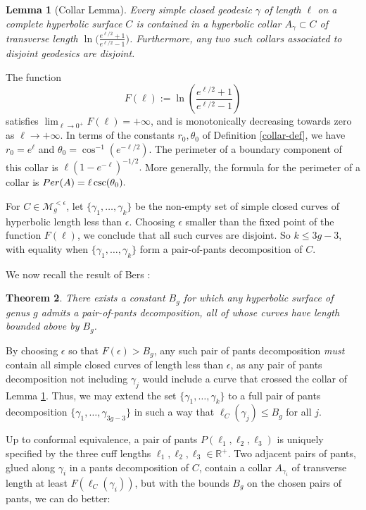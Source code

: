 \documentclass[10pt,letterpaper,english,reqno]{amsart}
\numberwithin{equation}{subsection}
\newcommand\cM{{\mathcal M}}
\newcommand\R{{\mathbb R}}
\newtheorem{theorem}{Theorem}[section]
\newtheorem{lemma}[theorem]{Lemma}
\theoremstyle{definition}
\begin{document}
\begin{lemma}[Collar Lemma]\label{universal-collar}
Every simple closed geodesic $\gamma$
of length $\ell$ on a complete
hyperbolic surface $C$ is contained in a
hyperbolic collar $A_\gamma\subset C$ of transverse
length $\ln \big(\frac{e^{\ell/2}+1}{e^{\ell/2}-1}\big)$.
Furthermore, any two such collars associated
to disjoint geodesics are disjoint. \end{lemma}

The function $$F(\ell):=\ln\left(\frac{e^{\ell/2}+1}{e^{\ell/2}-1}\right)$$ satisfies
$\lim_{\ell\to 0^+} F(\ell)=+\infty$, and is
monotonically decreasing towards zero as $\ell\to +\infty$.
In terms of the constants $r_0,\theta_0$ of 
Definition \ref{collar-def}, we have $r_0 = e^\ell$ and $\theta_0=\cos^{-1}(e^{-\ell/2})$.
The perimeter of
a boundary component of this collar is $\ell(1-e^{-\ell})^{-1/2}.$
More generally, the formula for the perimeter of a collar is ${\rm Per}(A)= \ell\csc(\theta_0).$

For $C\in \cM_g^{<\epsilon}$, let
$\{\gamma_1,\dots,\gamma_k\}$ be the non-empty set of simple closed curves
of hyperbolic length less than $\epsilon$. Choosing $\epsilon$
smaller than the fixed point of the function $F(\ell)$,
we conclude that all such curves are disjoint. 
So $k\leq 3g-3$, with equality when
$\{\gamma_1,\dots,\gamma_k\}$ form a pair-of-pants
decomposition of $C$.

We now recall the result of Bers \cite{bers1, bers2}:

\begin{theorem}\label{pair-of-pants} There exists a constant $B_g$
for which any hyperbolic surface of genus $g$ admits a
pair-of-pants decomposition, all of whose curves have
length bounded above by $B_g$.
\end{theorem}

By choosing $\epsilon$ so that $F(\epsilon)>B_g$,
any such pair of pants decomposition {\it must} contain
all simple closed curves of length less than $\epsilon$,
as any pair of pants decomposition not including
$\gamma_j$ would include a curve that crossed the collar of Lemma
\ref{universal-collar}.
Thus, we may extend the set $\{\gamma_1,\dots,\gamma_k\}$ to a
full pair of pants decomposition
$\{\gamma_1,\dots, \gamma_{3g-3}\}$ in such a way
that $\ell_C(\gamma_j)\leq B_g$ for all $j$.

Up to conformal equivalence, a pair of pants $P(\ell_1,\ell_2,\ell_3)$
is uniquely specified by the three cuff lengths
$\ell_1,\ell_2,\ell_3\in \R^+$. Two adjacent
pairs of pants, glued along $\gamma_i$
in a pants decomposition of $C$, contain a collar
$A_{\gamma_i}$ of transverse length
at least $F(\ell_C(\gamma_i))$, but with the bounds
$B_g$ on the chosen pairs of pants, we can
do better:
\end{document}
